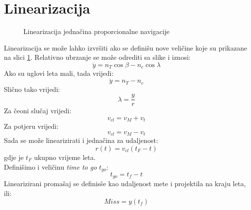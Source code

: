 \section{Linearizacija}
\begin{figure}[!ht]
    \centering
    \caption{Linearizacija jednačina proporcionalne navigacije}
    \label{fig:linear}
\end{figure}
\noindent Linearizacija se može lahko izvršiti ako se definišu nove veličine koje su prikazane na slici \ref{fig:linear}.
Relativno ubrzanje se može odrediti sa slike i iznosi:
\begin{equation}
    \ddot{y}=n_T\cos\beta-n_c\cos\lambda
\end{equation}
Ako su uglovi leta mali, tada vrijedi:
\begin{equation}
    \ddot{y}=n_T-n_c
\end{equation}
Slično tako vrijedi:
\begin{equation}
    \lambda = \frac{y}{r}
\end{equation}
Za čeoni slučaj vrijedi:
\begin{equation}
    v_{cl}=v_M+v_t
\end{equation}
Za potjeru vrijedi:
\begin{equation}
    v_{cl}=v_M-v_t
\end{equation}
Sada se može linearizirati i jednačina za udaljenost:
\begin{equation}
    r(t)=v_{cl}(t_F-t)
\end{equation}
gdje je $t_F$ ukupno vrijeme leta.\\
Definišimo i veličinu \textit{time to go} $t_{go}$:
\begin{equation}
    t_{go}=t_f-t
\end{equation}
Linearizirani promašaj se definisše kao udaljenost mete i projektila na kraju leta, ili:
\begin{equation}
    Miss=y(t_f)
\end{equation}

